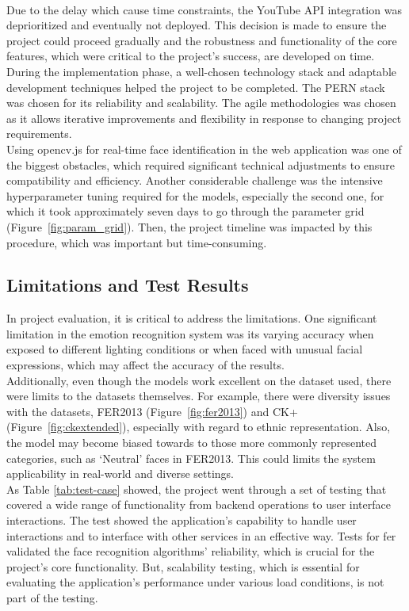 \\
\indent Due to the delay which cause time constraints, the YouTube API integration was deprioritized and eventually not deployed.
This decision is made to ensure the project could proceed gradually and the robustness and functionality of the core features, which were critical to the project's success, are developed on time.
\\
\indent During the implementation phase, a well-chosen technology stack and adaptable development techniques helped the project to be completed.
The PERN stack was chosen for its reliability and scalability. 
The agile methodologies was chosen as it allows iterative improvements and flexibility in response to changing project requirements.
\\
\indent Using opencv.js for real-time face identification in the web application was one of the biggest obstacles, which required significant technical adjustments to ensure compatibility and efficiency.
Another considerable challenge was the intensive hyperparameter tuning required for the models, especially the second one, for which it took approximately seven days to go through the parameter grid (Figure~\ref{fig:param_grid}). 
Then, the project timeline was impacted by this procedure, which was important but time-consuming.

\subsection{Limitations and Test Results}
In project evaluation, it is critical to address the limitations.
One significant limitation in the emotion recognition system was its varying accuracy when exposed to different lighting conditions or when faced with unusual facial expressions, which may affect the accuracy of the results.
\\
\indent Additionally, even though the models work excellent on the dataset used, there were limits to the datasets themselves.
For example, there were diversity issues with the datasets, FER2013 (Figure~\ref{fig:fer2013}) and CK+ (Figure~\ref{fig:ckextended}), especially with regard to ethnic representation.
Also, the model may become biased towards to those more commonly represented categories, such as `Neutral' faces in FER2013.
This could limits the system applicability in real-world and diverse settings.
\\
\indent As Table \ref{tab:test-case} showed, the project went through a set of testing that covered a wide range of functionality from backend operations to user interface interactions.
The test showed the application's capability to handle user interactions and to interface with other services in an effective way. 
Tests for \gls{fer} validated the face recognition algorithms' reliability, which is crucial for the project's core functionality.
But, scalability testing, which is essential for evaluating the application's performance under various load conditions, is not part of the testing. 

